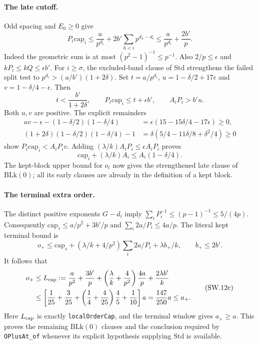 \paragraph{The late cutoff.}
Odd spacing and $E_0\ge0$ give
\[
 P_i\mathrm{cap}_i
 \le\frac a{p^{d_i}}+2b'\sum_{h<i}p^{d_h-d_i}
 \le\frac a{p^{d_i}}+\frac{2b'}p.
 \tag{SW.12a}
\]
Indeed the geometric sum is at most $(p^2-1)^{-1}\le p^{-1}$.
Also $2/p\le\epsilon$ and $kP_i\le kQ\le\epsilon b'$.
For $i\ge\sigma$, the excluded-band clause of $\mathrm{Std}$ strengthens
the failed split test to $p^{d_i}>(a/b')(1+2\delta)$.
Set $t=a/p^{d_i}$, $u=1-\delta/2+17\epsilon$ and
$v=1-\delta/4-\epsilon$. Then
\[
 t<\frac{b'}{1+2\delta},\qquad
 P_i\mathrm{cap}_i\le t+\epsilon b',\qquad A_iP_i>b'u.
\]
Both $u,v$ are positive. The explicit remainders
\[
\begin{aligned}
 uv-\epsilon-(1-\delta/2)(1-\delta/4)
   &=\epsilon(15-15\delta/4-17\epsilon)\ge0,\\
 (1+2\delta)(1-\delta/2)(1-\delta/4)-1
   &=\delta(5/4-11\delta/8+\delta^2/4)\ge0
\end{aligned}
\]
show $P_i\mathrm{cap}_i<A_iP_i v$.
Adding $(\lambda/k)A_iP_i\le\epsilon A_iP_i$ proves
\[
 \mathrm{cap}_i+(\lambda/k)A_i\le A_i(1-\delta/4).
 \tag{SW.12b}
\]
The kept-block upper bound for $o_i$ now gives the strengthened late
clause of $\mathrm{BLk}(0)$; all its early clauses are already in
the definition of a kept block.

\paragraph{The terminal extra order.}
The distinct positive exponents $G-d_i$ imply
$\sum_iP_i^{-1}\le(p-1)^{-1}\le5/(4p)$.
Consequently $\mathrm{cap}_s\le a/p^2+3b'/p$ and
$\sum_i2a/P_i\le4a/p$. The literal kept terminal bound is
\[
 o_+\le\mathrm{cap}_s+
  (\lambda/k+4/p^2)\sum_i2a/P_i+\lambda b_+/k,
 \qquad b_+\le2b'.
\]
It follows that
\[
\begin{aligned}
 o_+&\le L_{\rm cap}:=
  \frac a{p^2}+\frac{3b'}p+
  \left(\frac\lambda k+\frac4{p^2}\right)\frac{4a}p
  +\frac{2\lambda b'}k\\
 &\le\left[\frac1{25}+\frac3{25}
       +\left(\frac14+\frac4{25}\right)\frac45+\frac1{10}\right]a
   =\frac{147}{250}a\le a_+.
\end{aligned}
\tag{SW.12c}
\]
Here $L_{\rm cap}$ is exactly \texttt{localOrderCap}, and the terminal
window gives $a_+\ge a$. This proves the remaining $\mathrm{BLk}(0)$
clauses and the conclusion required by \texttt{OPlusAt\_of} whenever
its explicit hypothesis supplying $\mathrm{Std}$ is available.

